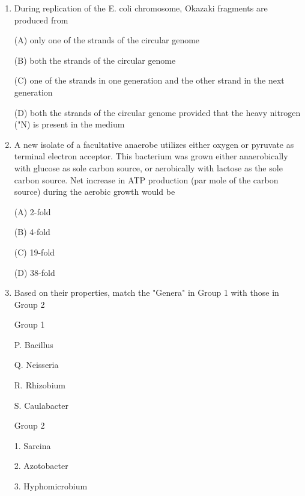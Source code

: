 \documentclass[journal]{IEEEtran}
\begin{document}
\begin{enumerate}
{\begin{minipage}{0.5\textwidth}
\begin{flushright}
5. Use of carbolic acid as disinfectant
		\end{flushright}
		\end{minipage}



(A) P-5,Q-3.R-4.S-1 (B) P-5,Q-3,R-1,5-2 (C) P-4.Q-3R-1,S-5 (D) P-3,Q-2,R-1.5-4

}
\item {During replication of the E. coli chromosome, Okazaki fragments are produced from

(A) only one of the strands of the circular genome

(B) both the strands of the circular genome

(C) one of the strands in one generation and the other strand in the next generation

(D) both the strands of the circular genome provided that the heavy nitrogen ("N) is present in the medium}

\item {A new isolate of a facultative anaerobe utilizes either oxygen or pyruvate as terminal electron acceptor. This bacterium was grown either anaerobically with glucose as sole carbon source, or aerobically with lactose as the sole carbon source. Net increase in ATP production (par mole of the carbon source) during the aerobic growth would be

(A) 2-fold

(B) 4-fold

(C) 19-fold

(D) 38-fold
}
\item {Based on their properties, match the "Genera" in Group 1 with those in Group 2}
\begin{minipage}{0.5\textwidth}
	\begin{flushleft}


Group 1

P. Bacillus

Q. Neisseria

R. Rhizobium

S. Caulabacter
		\end{flushleft}
		\end{minipage}
	\begin{minipage}{0.5\textwidth}
		\begin{flushright}

Group 2

1. Sarcina

2. Azotobacter

3. Hyphomicrobium


\end{flushright}
\end{minipage}
\end{enumerate}
\end{document}
